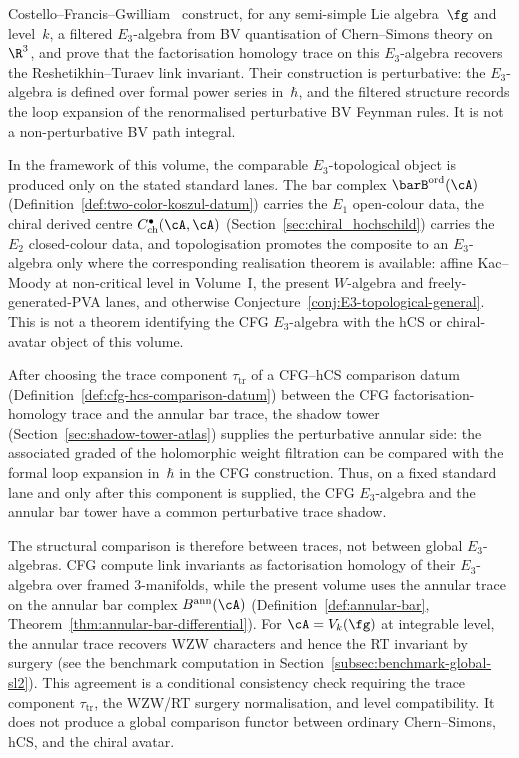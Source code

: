 \begin{remark}
\label{rem:CFG-comparison}
Costello--Francis--Gwilliam~\cite{CFG26} construct, for any
semi-simple Lie algebra~$\fg$ and level~$k$, a filtered
$E_3$-algebra from BV quantisation of Chern--Simons theory on
$\R^3$, and prove that the factorisation homology trace on
this $E_3$-algebra recovers the Reshetikhin--Turaev link
invariant. Their construction is perturbative: the
$E_3$-algebra is defined over formal power series in~$\hbar$,
and the filtered structure records the loop expansion of the
renormalised perturbative BV Feynman rules. It is not a
non-perturbative BV path integral.

In the framework of this volume, the comparable
$E_3$-topological object is produced only on the stated
standard lanes.  The bar complex
$\barB^{\mathrm{ord}}(\cA)$
(Definition~\ref{def:two-color-koszul-datum}) carries the
$E_1$ open-colour data, the chiral derived centre
$C^\bullet_{\mathrm{ch}}(\cA,\cA)$
(Section~\ref{sec:chiral_hochschild}) carries the
$E_2$ closed-colour data, and topologisation promotes the
composite to an $E_3$-algebra only where the corresponding
realisation theorem is available: affine Kac--Moody at
non-critical level in Volume~I, the present $W$-algebra and
freely-generated-PVA lanes, and otherwise
Conjecture~\ref*{conj:E3-topological-general}.  This is not a
theorem identifying the CFG $E_3$-algebra with the hCS or
chiral-avatar object of this volume.

After choosing the trace component $\tau_{\mathrm{tr}}$ of a
CFG--hCS comparison datum
(Definition~\ref{def:cfg-hcs-comparison-datum}) between the
CFG factorisation-homology trace and the annular bar trace, the
shadow tower (Section~\ref{sec:shadow-tower-atlas}) supplies the
perturbative annular side: the associated graded of the
holomorphic weight filtration can be compared with the formal loop
expansion in~$\hbar$ in the CFG construction.  Thus, on a fixed
standard lane and only after this component is supplied, the CFG
$E_3$-algebra and the annular bar tower have a common perturbative
trace shadow.

The structural comparison is therefore between traces, not
between global $E_3$-algebras.  CFG compute link invariants as
factorisation homology of their $E_3$-algebra over framed
$3$-manifolds, while the present volume uses the annular trace
on the annular bar complex $B^{\mathrm{ann}}(\cA)$
(Definition~\ref{def:annular-bar},
Theorem~\ref{thm:annular-bar-differential}).  For
$\cA = V_k(\fg)$ at integrable level, the annular trace
recovers WZW characters and hence the RT invariant by surgery
(see the benchmark computation in
Section~\ref{subsec:benchmark-global-sl2}).  This agreement is
a conditional consistency check requiring the trace component
$\tau_{\mathrm{tr}}$, the WZW/RT surgery normalisation, and level
compatibility.  It does not produce a global comparison functor
between ordinary Chern--Simons, hCS, and the chiral avatar.
\end{remark}

